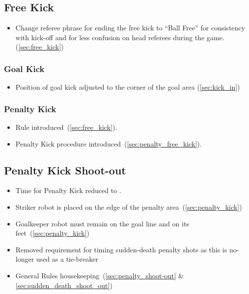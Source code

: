 \subsection*{Free Kick}
\begin{itemize}
  \item Change referee phrase for ending the free kick to ``Ball Free'' for consistency with kick-off and for less confusion on  head referees during the game.(\cf \cref{sec:free_kick})
\end{itemize}

\subsubsection*{Goal Kick}
\begin{itemize}
  \item Position of goal kick adjusted to the corner of the goal area (\cf \cref{sec:kick_in})
\end{itemize}

\subsubsection*{Penalty Kick}
\begin{itemize}
  \item Rule introduced~(\cf \cref{sec:free_kick}).
  \item Penalty Kick procedure introduced~(\cf \cref{sec:penalty_free_kick}).
\end{itemize}

\subsection*{Penalty Kick Shoot-out}
\begin{itemize}
  \item Time for Penalty Kick reduced to \PenaltyKickTime.
  \item Striker robot is placed on the edge of the penalty area~(\cf \cref{sec:penalty_kick})
  \item Goalkeeper robot must remain on the goal line and on its feet~(\cf \cref{sec:penalty_kick})
  \item Removed requirement for timing sudden-death penalty shots as this is no-longer used as a tie-breaker
  \item General Rules housekeeping~(\cf \cref{sec:penalty_shoot-out} \& \cref{sec:sudden_death_shoot_out})
\end{itemize}

